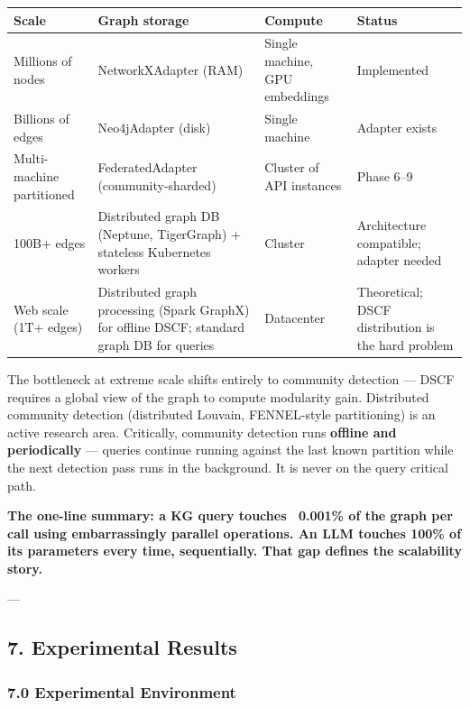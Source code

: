 \documentclass[10pt,journal,compsoc]{IEEEtran}
\begin{document}
\begin{center}
{\footnotesize
\begin{tabularx}{\columnwidth}{|>{\raggedright\arraybackslash}X|>{\raggedright\arraybackslash}X|>{\raggedright\arraybackslash}X|>{\raggedright\arraybackslash}X|}
\hline
Scale & Graph storage & Compute & Status \\ \hline
Millions of nodes & NetworkXAdapter (RAM) & Single machine, GPU embeddings & Implemented \\ \hline
Billions of edges & Neo4jAdapter (disk) & Single machine & Adapter exists \\ \hline
Multi-machine partitioned & FederatedAdapter (community-sharded) & Cluster of API instances & Phase 6–9 \\ \hline
100B+ edges & Distributed graph DB (Neptune, TigerGraph) + stateless Kubernetes workers & Cluster & Archit\-ecture compatible; adapter needed \\ \hline
Web scale (1T+ edges) & Distributed graph processing (Spark GraphX) for offline DSCF; standard graph DB for queries & Datacenter & Theoretical; DSCF distr\-ibution is the hard problem \\ \hline
\end{tabularx}
}
\end{center}

The bottleneck at extreme scale shifts entirely to community detection — DSCF requires a global view of the graph to compute modularity gain. Distributed community detection (distributed Louvain, FENNEL-style parti\-tioning) is an active research area. Critically, community detection runs \textbf{offline and perio\-dically} — queries continue running against the last known partition while the next detection pass runs in the background. It is never on the query critical path.

\textbf{The one-line summary: a KG query touches ~0.001\% of the graph per call using embar\-rassingly parallel operations. An LLM touches 100\% of its parameters every time, seque\-ntially. That gap defines the scalability story.}

---

\subsection{7. Experi\-mental Results}

\subsubsection{7.0 Experi\-mental Environment}
\end{document}
